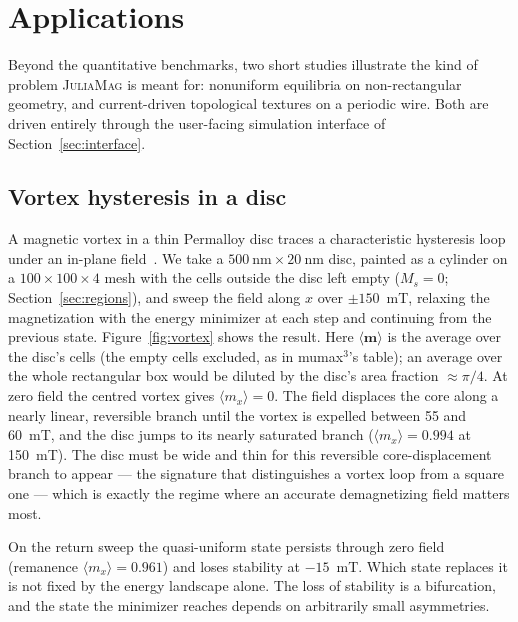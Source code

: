 \documentclass{article}      %
\newcommand{\JuliaMag}{\textsc{JuliaMag}}
\newcommand{\vm}{\bm{m}}
\begin{document}
\section{Applications}
\label{sec:applications}

Beyond the quantitative benchmarks, two short studies illustrate the kind of
problem \JuliaMag{} is meant for: nonuniform equilibria on non-rectangular
geometry, and current-driven topological textures on a periodic wire. Both are
driven entirely through the user-facing simulation interface of
Section~\ref{sec:interface}.

\subsection{Vortex hysteresis in a disc}
\label{sec:vortex}

A magnetic vortex in a thin Permalloy disc traces a characteristic hysteresis
loop under an in-plane field~\cite{guslienko2002}. We take a
$500~\mathrm{nm}\times20~\mathrm{nm}$ disc, painted as a cylinder on a
$100\times100\times4$ mesh with the cells outside the disc left empty
($M_s=0$; Section~\ref{sec:regions}), and sweep the field along $x$ over
$\pm150$~mT, relaxing the magnetization with the energy minimizer at each step
and continuing from the previous state. Figure~\ref{fig:vortex} shows the result.
Here $\langle\vm\rangle$ is the average over the disc's cells (the empty cells
excluded, as in mumax$^3$'s table); an average over the whole rectangular box would
be diluted by the disc's area fraction $\approx\pi/4$. At zero field the centred
vortex gives $\langle m_x\rangle=0$. The field displaces the core along a nearly
linear, reversible branch until the vortex is expelled between 55 and 60~mT, and
the disc jumps to its nearly saturated branch ($\langle m_x\rangle=0.994$ at
150~mT). The disc must be wide and thin for this reversible core-displacement
branch to appear --- the signature that distinguishes a vortex loop from a square
one --- which is exactly the regime where an accurate demagnetizing field
matters most.

On the return sweep the quasi-uniform state persists through zero field
(remanence $\langle m_x\rangle=0.961$) and loses stability at $-15$~mT. Which
state replaces it is not fixed by the energy landscape alone. The loss of
stability is a bifurcation, and the state the minimizer reaches depends on
arbitrarily small asymmetries.
\end{document}
